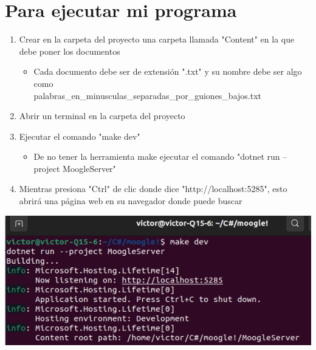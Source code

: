 \documentclass{article}
\begin{document}
\section{Para ejecutar mi programa}
  \begin{enumerate}
    \item Crear en la carpeta del proyecto una carpeta llamada "Content" en la que debe poner los documentos
      \begin{itemize}
        \renewcommand{\labelitemi}{$\diamond$}
        \item Cada documento debe ser de extensión ".txt" y su nombre debe ser algo como\\
        palabras\_en\_minusculas\_separadas\_por\_guiones\_bajos.txt
      \end{itemize} 
    \item Abrir un terminal en la carpeta del proyecto
    \item Ejecutar el comando "make dev"
      \begin{itemize}
        \renewcommand{\labelitemi}{$\diamond$}
        \item De no tener la herramienta make ejecutar el comando "dotnet run --project MoogleServer"
      \end{itemize}
    \item Mientras presiona "Ctrl" de clic donde dice "http://localhost:5285", esto abrirá una página web en su navegador donde puede buscar
  \end{enumerate}
\begin{center}
  \includegraphics[scale=0.80]{Imagenes/Ejecutar_moogle.png}
\end{center}
\end{document}
